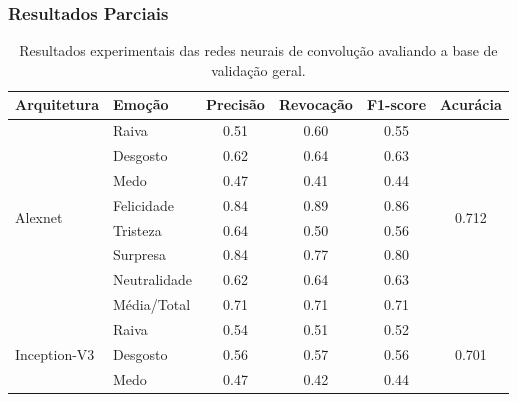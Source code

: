 \documentclass{beamer}
\begin{document}
\begin{frame}
 \frametitle{Resultados Parciais}
\begin{table}[]
\tiny
\centering
\caption{Resultados experimentais das redes neurais de convolução avaliando a base de validação geral.}
\label{table:resultsexp}
\begin{tabular}{llcccc}
\hline
\textbf{Arquitetura}                & \textbf{Emoção}       & \textbf{Precisão} & \textbf{Revocação} & \textbf{F1-score} & \textbf{Acurácia}               \\ \hline
\multirow{8}{*}{Alexnet}            & Raiva                 & 0.51              & 0.60               & 0.55              & \multirow{8}{*}{0.712}          \\
                                    & Desgosto              & 0.62              & 0.64               & 0.63              &                                 \\
                                    & Medo                  & 0.47              & 0.41               & 0.44              &                                 \\
                                    & Felicidade            & 0.84              & 0.89               & 0.86              &                                 \\
                                    & Tristeza              & 0.64              & 0.50               & 0.56              &                                 \\
                                    & Surpresa              & 0.84              & 0.77               & 0.80              &                                 \\
                                    & Neutralidade          & 0.62              & 0.64               & 0.63              &                                 \\
                                    & Média/Total           & 0.71              & 0.71               & 0.71              &                                 \\ \hline
\multirow{8}{*}{Inception-V3}       & Raiva                 & 0.54              & 0.51               & 0.52              & \multirow{8}{*}{0.701}          \\
                                    & Desgosto              & 0.56              & 0.57               & 0.56              &                                 \\
                                    & Medo                  & 0.47              & 0.42               & 0.44              &                                 \\

\end{tabular}
\end{table}
\end{frame}
\end{document}
